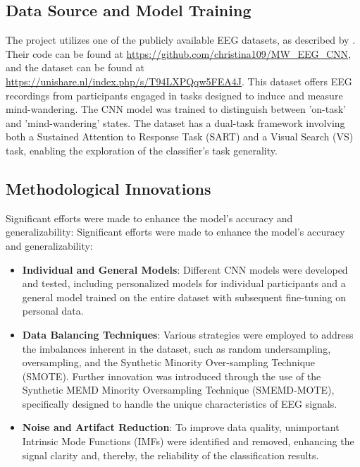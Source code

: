 \subsection{Data Source and Model Training}
The project utilizes one of the publicly available EEG datasets, as described by \cite{Jin2019PredictingMW}. Their code can be found at \href{https://github.com/christina109/MW_EEG_CNN}{https://github.com/christina109/MW_EEG_CNN}, and the dataset can be found at \href{https://unishare.nl/index.php/s/T94LXPQqw5FEA4J}{https://unishare.nl/index.php/s/T94LXPQqw5FEA4J}. This dataset offers EEG recordings from participants engaged in tasks designed to induce and measure mind-wandering. The CNN model was trained to distinguish between 'on-task' and 'mind-wandering' states. The dataset has a dual-task framework involving both a Sustained Attention to Response Task (SART) and a Visual Search (VS) task, enabling the exploration of the classifier's task generality.

\subsection{Methodological Innovations}
Significant efforts were made to enhance the model's accuracy and generalizability:
Significant efforts were made to enhance the model's accuracy and generalizability:
\begin{itemize}
    \item \textbf{Individual and General Models}: Different CNN models were developed and tested, including personalized models for individual participants and a general model trained on the entire dataset with subsequent fine-tuning on personal data.
    \item \textbf{Data Balancing Techniques}: Various strategies were employed to address the imbalances inherent in the dataset, such as random undersampling, oversampling, and the Synthetic Minority Over-sampling Technique (SMOTE). Further innovation was introduced through the use of the Synthetic MEMD Minority Oversampling Technique (SMEMD-MOTE), specifically designed to handle the unique characteristics of EEG signals.
    \item \textbf{Noise and Artifact Reduction}: To improve data quality, unimportant Intrinsic Mode Functions (IMFs) were identified and removed, enhancing the signal clarity and, thereby, the reliability of the classification results.
\end{itemize}

